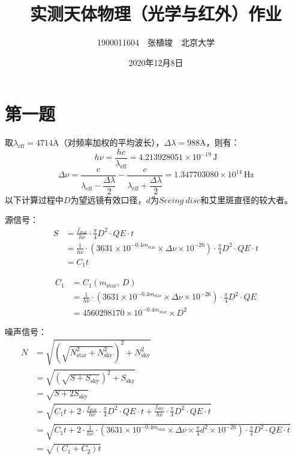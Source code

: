 \documentclass[a4paper,fontset=windows]{ctexart}
\begin{document}
\large

    \title{\textbf{实测天体物理\uppercase\expandafter{}（光学与红外）作业}}
    \author{1900011604\ \ 张植竣\ \ 北京大学}
    \date{2020年12月8日}

    \maketitle

    \section*{第一题}

    取$\lambda_{\mathrm{eff}} = 4714\mathring{\mathrm{A}}$（对频率加权的平均波长），$\Delta\lambda = 988\mathring{\mathrm{A}}$，则有：
    \[
    h\nu = \frac{hc}{\lambda_{\mathrm{eff}}} = 4.213928051 \times 10^{-19}\,\mathrm{J}
    \]
    \[
    \Delta\nu = \frac{c}{\lambda_{\mathrm{eff}} - \dfrac{\Delta\lambda}{2}} - \frac{c}{\lambda_{\mathrm{eff}} + \dfrac{\Delta\lambda}{2}} = 1.347703080 \times 10^{14}\,\mathrm{Hz}
    \]
    以下计算过程中$D$为望远镜有效口径，$d$为$Seeing\ disc$和艾里斑直径的较大者。

    源信号：
    \begin{align*}
    S
    &= \frac{f_{\mathrm{star}}}{h\nu} \cdot \frac{\pi}{4}D^2 \cdot QE \cdot t \\
    &= \frac{1}{h\nu} \cdot \left(3631 \times 10^{-0.4m_{\mathrm{star}}} \times \Delta\nu \times 10^{-26}\right) \cdot \frac{\pi}{4}D^2 \cdot QE \cdot t \\
    &= C_1 t
    \end{align*}

    \begin{align*}
        C_1
        &= C_1(m_{\mathrm{star}}, \, D) \\
        &= \frac{1}{h\nu} \cdot \left(3631 \times 10^{-0.4m_{\mathrm{star}}} \times \Delta\nu \times 10^{-26}\right) \cdot \frac{\pi}{4}D^2 \cdot QE \\
        &= 4560298170 \times 10^{-0.4m_{\mathrm{star}}} \times D^2
    \end{align*}

    噪声信号：
    \begin{align*}
        N
        &= \sqrt{\left(\sqrt{N_{\mathrm{star}}^2 + N_{\mathrm{sky}}^2}\right)^2 + N_{\mathrm{sky}}^2} \\
        &= \sqrt{\left(\sqrt{S + S_{\mathrm{sky}}}\right)^2 + S_{\mathrm{sky}}} \\
        &= \sqrt{S + 2S_{\mathrm{sky}}} \\
        &= \sqrt{C_1 t + 2 \cdot \frac{f_{\mathrm{star}}}{h\nu} \cdot \frac{\pi}{4}D^2 \cdot QE \cdot t + \frac{f_{\mathrm{sky}}}{h\nu} \cdot \frac{\pi}{4}D^2 \cdot QE \cdot t} \\
        &= \sqrt{C_1 t + 2 \cdot \frac{1}{h\nu} \cdot \left(3631 \times 10^{-0.4m_{\mathrm{star}}} \times \Delta\nu \times \frac{\pi}{4}d^2 \times 10^{-26}\right) \cdot \frac{\pi}{4}D^2 \cdot QE \cdot t} \\
        &= \sqrt{(C_1 + C_2)t}
    \end{align*}
\end{document}
